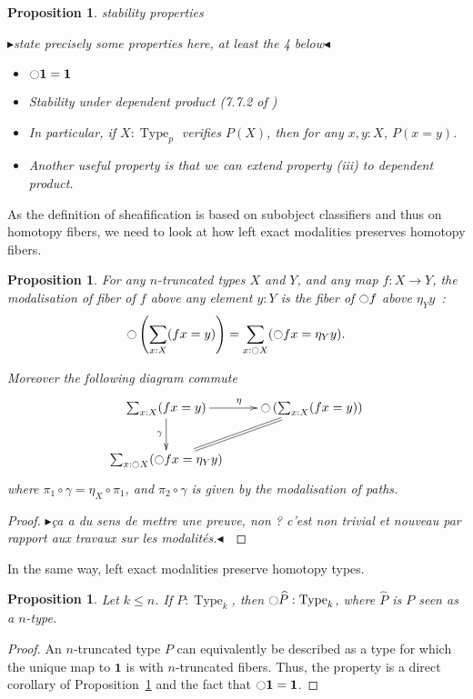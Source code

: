 \documentclass[conference]{IEEEtran}
\newtheorem{prop}[thm]{Proposition}
\newcommand{\mynote}[2]{
    \fbox{\bfseries\sffamily\scriptsize#1}
    {\small$\blacktriangleright$\textsf{\emph{#2}}$\blacktriangleleft$}~}
\newcommand\nt[1]{\mynote{NT}{#1}}
\DeclareMathOperator{\Type}{Type}
\newcommand{\modal}{\ensuremath{\ocircle}}
\newcommand \one {\mathbf{1}}
\begin{document}
\begin{prop}

stability properties
\vspace{1em}

\nt{state precisely some properties here, at least the 4 below}

\vspace{1em}

\begin{itemize}

\item
$\modal \one =\one $
\item
Stability under dependent product (7.7.2 of \cite{hottbook})
\item
 In particular, if $X:\Type_p$ verifies
$P(X)$, then for any $x,y:X$, $P(x=y)$.
\item
Another useful property is that we can extend property {\it (iii)} to
dependent product.
\end{itemize}
\end{prop}

As the definition of sheafification is based on subobject classifiers
and thus on homotopy fibers, we need to look at how left exact
modalities preserves homotopy fibers.
\begin{prop}
\label{sec:defin-basic-prop}
For any $n$-truncated types $X$ and $Y$,
and any map $f:X \to Y$, the modalisation of fiber of $f$ above any element $y:Y$
is the fiber of $\modal f$ above $\eta_Y y$~:
$$\modal \left(\sum_{x:X}  (f x = y)\right) = \sum_{x:\modal X} (\modal f x = \eta_Y y).$$

Moreover the following diagram commute
$$\xymatrix{
  \sum_{x:X} (f x = y) \ar[r]^\eta \ar[d]_\gamma & \modal \left(\sum_{x:X}  (f x = y)\right) \ar@{=}[dl]\\
  \sum_{x:\modal X} (\modal f x = \eta_Y y) &
}$$
where $\pi_1 \circ \gamma = \eta_X \circ \pi_1$, and $\pi_2 \circ
\gamma$ is given by the modalisation of paths.
\end{prop}
\begin{proof}
\nt{ça a du sens de mettre une preuve, non ? c'est non trivial et
  nouveau par rapport aux travaux sur les modalités.}
\end{proof}


In the same way, left exact modalities preserve homotopy types.
\begin{prop}
  Let $k \leq n$.
  If $P:\Type_k$, then $\modal \widehat P : \Type_k$, where $\widehat P$
  is $P$ seen as a $n$-type.
\end{prop}
\begin{proof}
  An $n$-truncated type $P$ can equivalently be described as a type for
  which the unique map to $\one$ is with $n$-truncated fibers. Thus, the
  property is a direct corollary of
  Proposition~\ref{sec:defin-basic-prop} and the fact that $\modal \one =
  \one$.
\end{proof}
\end{document}
